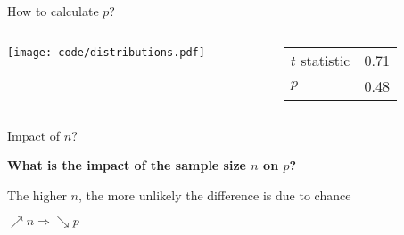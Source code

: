 \documentclass[compress]{beamer}
\begin{document}
\begin{frame}{How to calculate $p$?}
{\begin{columns}
\begin{column}{0.5\linewidth}
            \texttt{[image: code/distributions.pdf]}
        \end{column}
        \begin{column}{0.5\linewidth}

        \begin{tabular}{@{}ll@{}}
    \toprule
    $t$ statistic & 0.71                 \\
    $p$ & 0.48              \\ \bottomrule
    \end{tabular}

        \end{column}
    \end{columns}
}



\end{frame}

\begin{frame}{Impact of $n$?}

    \begin{center}\bf What is the impact of the sample size $n$ on $p$?\end{center}
    \pause

    The higher $n$, the more unlikely the difference is due to chance
    \begin{center}{\Large $\nearrow n \Rightarrow \searrow p$}\end{center}

    \pause
    
\end{frame}
\end{document}
